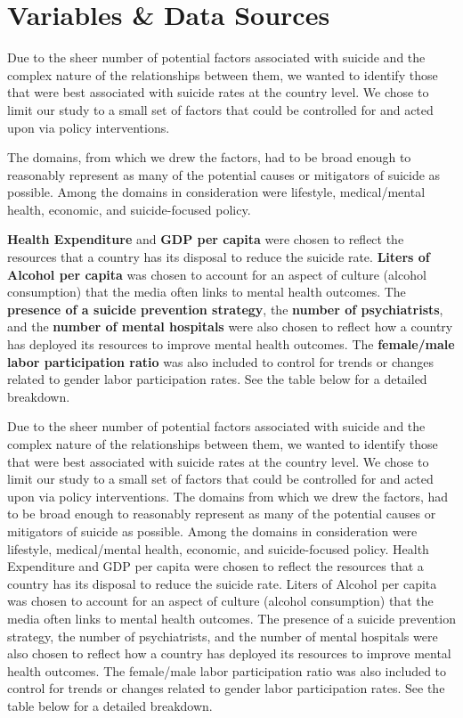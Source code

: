 \documentclass[]{article}
\begin{document}
\section{Variables \& Data Sources}\label{variables-data-sources}

Due to the sheer number of potential factors associated with suicide and
the complex nature of the relationships between them, we wanted to
identify those that were best associated with suicide rates at the
country level. We chose to limit our study to a small set of factors
that could be controlled for and acted upon via policy interventions.

The domains, from which we drew the factors, had to be broad enough to
reasonably represent as many of the potential causes or mitigators of
suicide as possible. Among the domains in consideration were lifestyle,
medical/mental health, economic, and suicide-focused policy.

\textbf{Health Expenditure} and \textbf{GDP per capita} were chosen to
reflect the resources that a country has its disposal to reduce the
suicide rate. \textbf{Liters of Alcohol per capita} was chosen to
account for an aspect of culture (alcohol consumption) that the media
often links to mental health outcomes. The \textbf{presence of a suicide
prevention strategy}, the \textbf{number of psychiatrists}, and the
\textbf{number of mental hospitals} were also chosen to reflect how a
country has deployed its resources to improve mental health outcomes.
The \textbf{female/male labor participation ratio} was also included to
control for trends or changes related to gender labor participation
rates. See the table below for a detailed breakdown.

Due to the sheer number of potential factors associated with suicide and
the complex nature of the relationships between them, we wanted to
identify those that were best associated with suicide rates at the
country level. We chose to limit our study to a small set of factors
that could be controlled for and acted upon via policy interventions.
The domains from which we drew the factors, had to be broad enough to
reasonably represent as many of the potential causes or mitigators of
suicide as possible. Among the domains in consideration were lifestyle,
medical/mental health, economic, and suicide-focused policy. Health
Expenditure and GDP per capita were chosen to reflect the resources that
a country has its disposal to reduce the suicide rate. Liters of Alcohol
per capita was chosen to account for an aspect of culture (alcohol
consumption) that the media often links to mental health outcomes. The
presence of a suicide prevention strategy, the number of psychiatrists,
and the number of mental hospitals were also chosen to reflect how a
country has deployed its resources to improve mental health outcomes.
The female/male labor participation ratio was also included to control
for trends or changes related to gender labor participation rates. See
the table below for a detailed breakdown.
\end{document}
